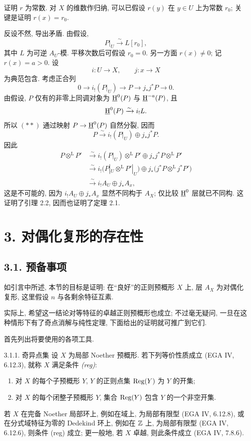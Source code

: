 \begin{prooftext}
证明 $r$ 为常数. 对 $X$ 的维数作归纳, 可以已假设 $r(y)$ 在 $y\in U$ 上为常数 $r_0$; 关键是证明 $r(x)=r_0$.

反设不然, 导出矛盾. 由假设,
\[
   P|_U\xrightarrow{\sim}L[r_0],
\]
其中 $L$ 为可逆 $A_U$-模. 平移次数后可假设 $r_0=0$. 另一方面 $r(x)\ne0$; 记 $r(x)=a>0$. 设
\[
   i:U\to X,
   \qquad
   j:x\to X
\]
为典范包含. 考虑正合列
\begin{equation}
0\longrightarrow i_!(P|_U)\longrightarrow P\longrightarrow j_*j^*P\longrightarrow0.\tag{**}
\end{equation}
由假设, $P$ 仅有的非零上同调对象为 $\underline{\mathrm H}^0(P)$ 与 $\underline{\mathrm H}^{-a}(P)$, 且
\[
   \underline{\mathrm H}^0(P)\xrightarrow{\sim}i_!L.
\]
所以 $(**)$ 通过映射 $P\to\underline{\mathrm H}^0(P)$ 自然分裂, 因而
\[
   P\xrightarrow{\sim} i_!(P|_U)\oplus j_*j^*P.
\]
因此
\begin{align*}
P\otimes^{\mathrm L}P'
&\xrightarrow{\sim} i_!(P|_U)\otimes^{\mathrm L}P'
      \oplus j_*j^*P\otimes^{\mathrm L}P' \\
&\xrightarrow{\sim} i_!\bigl(P|_U\otimes^{\mathrm L}P'|_U\bigr)
      \oplus j_*\bigl(j^*P\otimes^{\mathrm L}j^*P'\bigr)\\
&\xrightarrow{\sim} i_!A_U\oplus j_*A_x,
\end{align*}
这是不可能的, 因为 $i_!A_U\oplus j_*A_x$ 显然不同构于 $A_X$; 仅比较 $\underline{\mathrm H}^0$ 层就已不同构. 这证明了引理 2.2, 因而也证明了定理 2.1. \qedtext
\end{prooftext}

\section*{3. 对偶化复形的存在性}

\subsection*{3.1. 预备事项}

如引言中所述, 本节的目标是证明: 在“良好”的正则预概形 $X$ 上, 层 $A_X$ 为对偶化复形, 这里假设 $n$ 与各剩余特征互素.

实际上, 希望这一结论对等特征的卓越正则预概形也成立; 不过毫无疑问, 一旦在这种情形下有了奇点消解与纯性定理, 下面给出的证明就可推广到它们.

首先列出将要使用的各项工具.

\begin{statement}{3.1.1. 奇异点集}
设 $X$ 为局部 Noether 预概形. 若下列等价性质成立 (EGA IV, 6.12.3), 就称 $X$ 满足条件 \emph{(reg)}:
\begin{enumerate}[label=(\roman*)]
\item 对 $X$ 的每个子预概形 $Y$, $Y$ 的正则点集 $\operatorname{Reg}(Y)$ 为 $Y$ 的开集;
\item 对 $X$ 的每个闭整子预概形 $Y$, 集合 $\operatorname{Reg}(Y)$ 包含 $Y$ 的一个非空开集.
\end{enumerate}
若 $X$ 在完备 Noether 局部环上, 例如在域上, 为局部有限型 (EGA IV, 6.12.8), 或在分式域特征为零的 Dedekind 环上, 例如在 $\mathbb{Z}$ 上, 为局部有限型 (EGA IV, 6.12.6), 则条件 (reg) 成立; 更一般地, 若 $X$ 卓越, 则此条件成立 (EGA IV, 7.8.6).
\end{statement}


